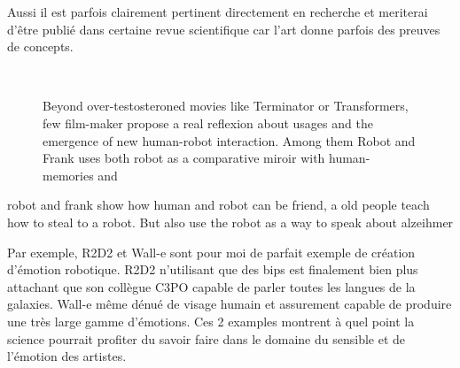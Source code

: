 Aussi il est parfois clairement pertinent directement en recherche et meriterai d'être publié dans certaine revue scientifique car l'art donne parfois des preuves de concepts.


\begin{figure}[]
\centering
    \\
    \caption{Beyond over-testosteroned movies like Terminator or Transformers, few film-maker propose a real reflexion about usages and the emergence of new human-robot interaction. Among them Robot and Frank uses both robot as a comparative miroir with human-memories and}
    \label{fig:}
\end{figure}

robot and frank show how human and robot can be friend, a old people teach how to steal to a robot. But also use the robot as a way to speak about alzeihmer

\begin{figure}[]
\centering
    \hfil
    \caption{}
    \label{fig:}
\end{figure}

Par exemple, R2D2 et Wall-e sont pour moi de parfait exemple de création d'émotion robotique. R2D2 n'utilisant que des bips est finalement bien plus attachant que son collègue C3PO capable de parler toutes les langues de la galaxies. Wall-e même dénué de visage humain et assurement capable de produire une très large gamme d'émotions.
Ces 2 examples montrent à quel point la science pourrait profiter du savoir faire dans le domaine du sensible et de l'émotion des artistes.





